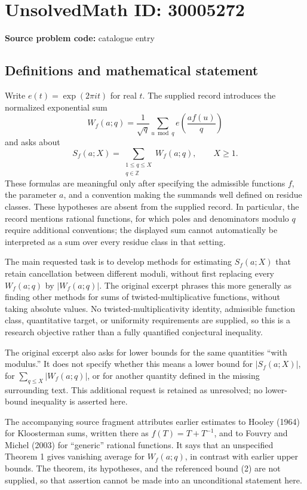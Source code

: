 \documentclass[11pt]{article}
\newcommand{\Z}{\mathbb{Z}}
\begin{document}
\section*{UnsolvedMath ID: 30005272}
\textbf{Source problem code:} catalogue entry
\subsection{Definitions and mathematical statement}
Write \(e(t)=\exp(2\pi i t)\) for real \(t\). The supplied record introduces the normalized exponential sum
\[
W_f(a;q)=\frac{1}{\sqrt q}\sum_{u\bmod q}e\!\left(\frac{a f(u)}q\right)
\]
and asks about
\[
S_f(a;X)=\sum_{\substack{1\le q\le X\\q\in\Z}}W_f(a;q),\qquad X\ge1.
\]
These formulas are meaningful only after specifying the admissible functions \(f\), the parameter \(a\), and a convention making the summands well defined on residue classes. These hypotheses are absent from the supplied record. In particular, the record mentions rational functions, for which poles and denominators modulo \(q\) require additional conventions; the displayed sum cannot automatically be interpreted as a sum over every residue class in that setting.

The main requested task is to develop methods for estimating \(S_f(a;X)\) that retain cancellation between different moduli, without first replacing every \(W_f(a;q)\) by \(|W_f(a;q)|\). The original excerpt phrases this more generally as finding other methods for sums of twisted-multiplicative functions, without taking absolute values. No twisted-multiplicativity identity, admissible function class, quantitative target, or uniformity requirements are supplied, so this is a research objective rather than a fully quantified conjectural inequality.

The original excerpt also asks for lower bounds for the same quantities ``with modulus.'' It does not specify whether this means a lower bound for \(|S_f(a;X)|\), for \(\sum_{q\le X}|W_f(a;q)|\), or for another quantity defined in the missing surrounding text. This additional request is retained as unresolved; no lower-bound inequality is asserted here.

The accompanying source fragment attributes earlier estimates to Hooley (1964) for Kloosterman sums, written there as \(f(T)=T+T^{-1}\), and to Fouvry and Michel (2003) for ``generic'' rational functions. It says that an unspecified Theorem 1 gives vanishing average for \(W_f(a;q)\), in contrast with earlier upper bounds. The theorem, its hypotheses, and the referenced bound (2) are not supplied, so that assertion cannot be made into an unconditional statement here.
\end{document}
